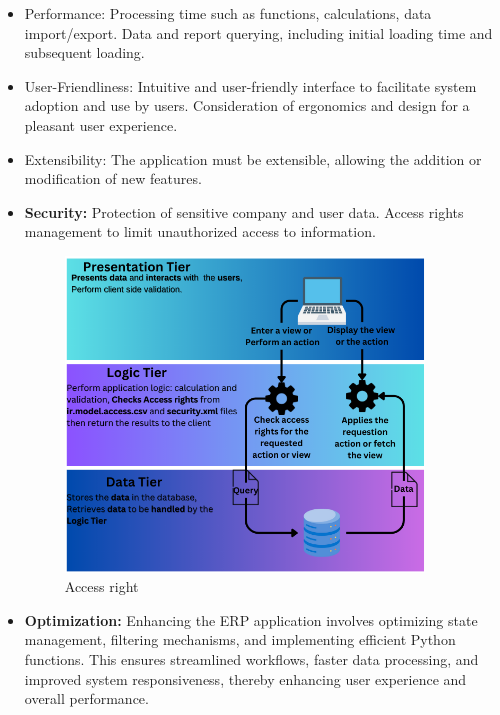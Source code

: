 \begin{itemize}
    \item Performance: Processing time such as functions, calculations, data import/export. Data and report querying, including initial loading time and subsequent loading.
    \item User-Friendliness: Intuitive and user-friendly interface to facilitate system adoption and use by users. Consideration of ergonomics and design for a pleasant user experience.
    \item Extensibility: The application must be extensible, allowing the addition or modification of new features.
    \item \textbf{Security:} Protection of sensitive company and user data. Access rights management to limit unauthorized access to information.


\begin{figure}[htbp]
    \centering
    \includegraphics[width=0.9\textwidth]{media/security.png}
    \caption{Access right}
    \label{fig:security}
\end{figure}

\newpage

    \item \textbf{Optimization:} Enhancing the ERP application involves optimizing state management, filtering mechanisms, and implementing efficient Python functions. This ensures streamlined workflows, faster data processing, and improved system responsiveness, thereby enhancing user experience and overall performance.


\end{itemize}
